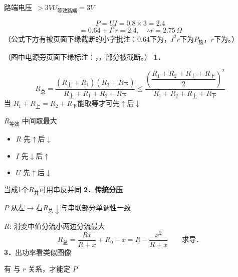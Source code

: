 路端电压\ $>3\unit{V}$\quad $U_{\text{等效路端}}=3\unit{V}$

\[ P=UI=0.8\times3=2.4 \]
\[ =0.64+I^{2}r=2.4,\quad \therefore r=2.75\,\Omega \]
（公式下方有被页面下缘截断的小字批注：0.64下为，$I^2r$下为$P_{\text{热}}$，$r$下为。）

（图中电源旁页面下缘标注：，，部分被截断。）
\textbf{1．}


\[R_{\text{总}}=\frac{(R_{\text{上}}+R_1)(R_2+R_{\text{下}})}{R_{\text{上}}+R_1+R_2+R_{\text{下}}}\le\frac{\left(\dfrac{R_1+R_2+R_{\text{上}}+R_{\text{下}}}{2}\right)^2}{R_1+R_2+R_{\text{上}}+R_{\text{下}}}\]
当 $R_1+R_{\text{上}}=R_2+R_{\text{下}}$\quad 能取等才可先$\uparrow$后$\downarrow$

$R_{\text{等效}}$ 中间取最大
\begin{itemize}
\item $R$ 先$\uparrow$后$\downarrow$
\item $I$ 先$\downarrow$后$\uparrow$
\item $U$ 先$\uparrow$后$\downarrow$
\end{itemize}
当成1个$R_{\text{并}}$可用串反并同
\textbf{2．传统分压}


$P$ 从左$\to$右\quad $R_{\text{总}}\downarrow$\quad 与串联部分单调性一致 %

$R$: 滑变中值分流小\quad 两边分流最大
\[R_{\text{总}}=\frac{Rx}{R+x}+R_0-x=R-\frac{x^2}{R+x}\qquad\text{求导．}\]
\textbf{3．}出功率看类似图像


有  与 $r$ 关系，才能定 $P$

